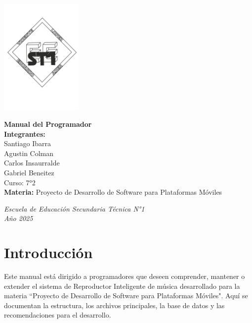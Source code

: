 \documentclass[a4paper,12pt]{article}
\begin{document}
\begin{flushright}
    \includegraphics[width=4cm]{LOGO-EEST1.png}
\end{flushright}

\vspace*{2cm}

\begin{center}
    {\LARGE\bfseries Manual del Programador} \\[1.5cm]
    \textbf{Integrantes:} \\[0.3cm]
    Santiago Ibarra \\[0.2cm]
    Agustin Colman \\[0.2cm]
    Carlos Insaurralde \\[0.2cm]
    Gabriel Beneitez \\[1.2cm]
    Curso: 7°2 \\
    \vspace{0.5cm}
    \textbf{Materia:} Proyecto de Desarrollo de Software para Plataformas Móviles
\end{center}

\vfill

\begin{center}
    \textit{Escuela de Educación Secundaria Técnica N°1} \\
    \textit{Año 2025}
\end{center}

\thispagestyle{empty}
\newpage

\tableofcontents
\newpage

\section{Introducción}
Este manual está dirigido a programadores que deseen comprender, mantener o extender el sistema de Reproductor Inteligente de música desarrollado para la materia ``Proyecto de Desarrollo de Software para Plataformas Móviles". Aquí se documentan la estructura, los archivos principales, la base de datos y las recomendaciones para el desarrollo.
\end{document}

